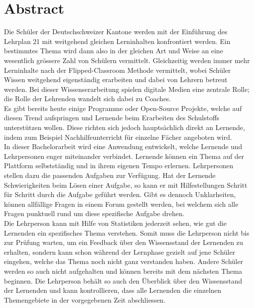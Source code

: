 \afterpage{\blankpage}
\section*{Abstract}

Die Schüler der Deutschschweizer Kantone werden mit der Einführung des Lehrplan 21 mit weitgehend gleichen Lerninhalten konfrontiert werden. Ein bestimmtes Thema wird dann also in der gleichen Art und Weise an eine wesentlich grössere Zahl von Schülern vermittelt. Gleichzeitig werden immer mehr Lerninhalte nach der Flipped-Classroom Methode vermittelt, wobei Schüler Wissen weitgehend eigenständig erarbeiten und dabei von Lehrern betreut werden. Bei dieser Wissenserarbeitung spielen digitale Medien eine zentrale Rolle; die Rolle der Lehrenden wandelt sich dabei zu Coaches. \\

Es gibt bereits heute einige Programme oder Open-Source Projekte, welche auf diesen Trend aufspringen und Lernende beim Erarbeiten des Schulstoffs unterstützen wollen. Diese richten sich jedoch hauptsächlich direkt an Lernende, indem zum Beispiel Nachhilfeunterricht für einzelne Fächer angeboten wird. \\

In dieser Bachelorarbeit wird eine Anwendung entwickelt, welche Lernende und Lehrpersonen enger miteinander verbindet. Lernende können ein Thema auf der Plattform selbstständig und in ihrem eigenen Tempo erlernen. Lehrpersonen stellen dazu die passenden Aufgaben zur Verfügung. Hat der Lernende Schwierigkeiten beim Lösen einer Aufgabe, so kann er mit Hilfestellungen Schritt für Schritt durch die Aufgabe geführt werden. Gibt es dennoch Unklarheiten, können allfällige Fragen in einem Forum gestellt werden, bei welchem sich alle Fragen punktuell rund um diese spezifische Aufgabe drehen. \\

Die Lehrperson kann mit Hilfe von Statistiken jederzeit sehen, wie gut die Lernenden ein spezifisches Thema verstehen. Somit muss die Lehrperson nicht bis zur Prüfung warten, um ein Feedback über den Wissensstand der Lernenden zu erhalten, sondern kann schon während der Lernphase gezielt auf jene Schüler eingehen, welche das Thema noch nicht ganz verstanden haben. Andere Schüler werden so auch nicht aufgehalten und können bereits mit dem nächsten Thema beginnen. Die Lehrperson behält so auch den Überblick über den Wissensstand der Lernenden und kann kontrollieren, dass alle Lernenden die einzelnen Themengebiete in der vorgegebenen Zeit abschliessen.


\newpage